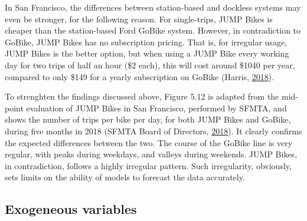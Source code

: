 \documentclass[12pt,oneside]{reedthesis}
\begin{document}
In San Francisco, the differences between station-based and dockless
systems may even be stronger, for the following reason. For
single-trips, JUMP Bikes is cheaper than the station-based Ford GoBike
system. However, in contradiction to GoBike, JUMP Bikes has no
subscription pricing. That is, for irregular usage, JUMP Bikes is the
better option, but when using a JUMP Bike every working day for two
trips of half an hour (\$2 each), this will cost around \$1040 per year,
compared to only \$149 for a yearly subscription on GoBike (Harris,
\protect\hyperlink{ref-harris2018}{2018}).

To strenghten the findings discussed above, Figure 5.12 is adapted from
the mid-point evaluation of JUMP Bikes in San Francisco, performed by
SFMTA, and shows the number of trips per bike per day, for both JUMP
Bikes and GoBike, during five months in 2018 (SFMTA Board of Directors,
\protect\hyperlink{ref-sfmta2018three}{2018}). It clearly confirms the
expected differences between the two. The course of the GoBike line is
very regular, with peaks during weekdays, and valleys during weekends.
JUMP Bikes, in contradiction, follows a highly irregular pattern. Such
irregularity, obviously, sets limits on the ability of models to
forecast the data accurately.

\subsection{Exogeneous variables}\label{exogeneous-variables}
\end{document}
